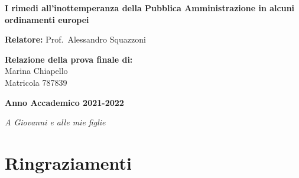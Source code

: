 \documentclass[12pt,it,a4paper,]{report}
\begin{document}
\begin{titlepage}
        \vspace{10mm}
        
      	\begin{center}
            {\LARGE{
                    \textbf{I rimedi all'inottemperanza della Pubblica
Amministrazione in alcuni ordinamenti europei}
                    \par
            }}
        \end{center}

        
        \vspace{8mm}

        \noindent
        {\large \textbf{Relatore:}  Prof.~Alessandro Squazzoni } \\

        \vspace{5mm}

        \begin{flushright}
            {\large \textbf{Relazione della prova finale di:}} \\
            \large{Marina Chiapello} \\
            \large{Matricola 787839} 
        \end{flushright}
        
        \vspace{5mm}
        \begin{center}
            {\large{\bf Anno Accademico 2021-2022}}
        \end{center}

        \restoregeometry
        
    \end{titlepage}




\vspace*{\fill}

\noindent \hfill{
\textit{
A Giovanni e alle mie figlie
}} \vspace*{\fill}  \newpage

\setcounter{page}{1}

\hypertarget{ringraziamenti}{%
\chapter*{Ringraziamenti}\label{ringraziamenti}}
\end{document}
